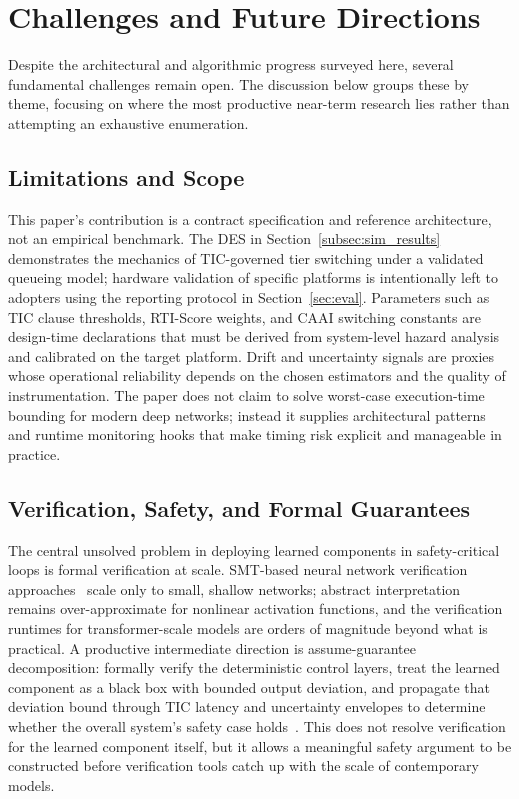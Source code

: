 \documentclass[smallextended]{svjour3}
\begin{document}
\section{Challenges and Future Directions}
\label{sec:future}

Despite the architectural and algorithmic progress surveyed here, several
fundamental challenges remain open. The discussion below groups these by theme, focusing on where the most productive near-term research lies rather than attempting an exhaustive enumeration.

\subsection{Limitations and Scope}
\label{subsec:limitations}

This paper's contribution is a contract specification and reference architecture, not an empirical benchmark. The DES in Section~\ref{subsec:sim_results} demonstrates the mechanics of TIC-governed tier switching under a validated queueing model; hardware validation of specific platforms is intentionally left to adopters using the reporting protocol in Section~\ref{sec:eval}. Parameters such as TIC clause thresholds, RTI-Score weights, and CAAI switching constants are design-time declarations that must be derived from system-level hazard analysis and calibrated on the target platform. Drift and uncertainty signals are proxies whose operational reliability depends on the chosen estimators and the quality of instrumentation. The paper does not claim to solve worst-case execution-time bounding for modern deep networks; instead it supplies architectural patterns and runtime monitoring hooks that make timing risk explicit and manageable in practice.

\subsection{Verification, Safety, and Formal Guarantees}

The central unsolved problem in deploying learned components in safety-critical loops is formal verification at scale. SMT-based neural network verification approaches~\cite{seshia2022} scale only to small, shallow networks; abstract interpretation remains over-approximate for nonlinear activation functions, and the verification runtimes for transformer-scale models are orders of magnitude beyond what is practical. A productive intermediate direction is assume-guarantee decomposition: formally verify the deterministic control layers, treat the learned component as a black box with bounded output deviation, and propagate that deviation bound through TIC latency and uncertainty envelopes to determine whether the overall system's safety case holds~\cite{brunke2022}. This does not resolve verification for the learned component itself, but it allows a meaningful safety argument to be constructed before verification tools catch up with the scale of contemporary models.
\end{document}
